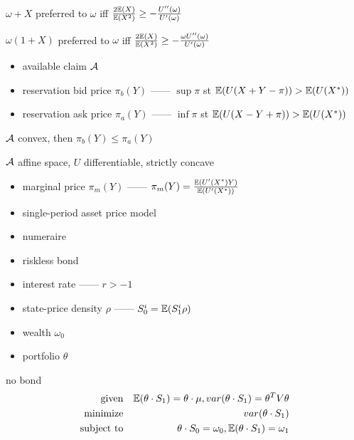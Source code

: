 \begin{fact}
    $\omega + X$ preferred to $\omega$ iff $\frac{2\mathbb{E}(X)}{\mathbb{E}(X^2)} \geq  -\frac{U''(\omega)}{U'(\omega)}$
\end{fact}

\begin{fact}
    $\omega(1 + X)$ preferred to $\omega$ iff $\frac{2\mathbb{E}(X)}{\mathbb{E}(X^2)} \geq  -\frac{\omega U''(\omega)}{U'(\omega)}$
\end{fact}

\begin{itemize}
    \item available claim $\mathcal{A}$
    \item reservation bid price $\pi_b(Y)$ ------ $\sup \pi$ st $\mathbb{E}(U(X + Y - \pi)) > \mathbb{E}(U(X^*))$
    \item reservation ask price $\pi_a(Y)$ ------ $\inf \pi$ st $\mathbb{E}(U(X - Y + \pi)) > \mathbb{E}(U(X^*))$
\end{itemize}

\begin{prop}
    $\mathcal{A}$ convex, then $\pi_b(Y) \leq \pi_a(Y)$
\end{prop}

\begin{setting}
    $\mathcal{A}$ affine space, $U$ differentiable, strictly concave
\end{setting}

\begin{itemize}
    \item marginal price $\pi_m(Y)$ ------ $\pi_m(Y) = \frac{\mathbb{E}(U'(X^*)Y)}{\mathbb{E}(U'(X^*))}$
\end{itemize}

\begin{itemize}
    \item single-period asset price model
    \item numeraire
    \item riskless bond
    \item interest rate ------ $r > -1$
    \item state-price density $\rho$ ------ $S_0^i = \mathbb{E}(S^i_1\rho)$
    \item wealth $\omega_0$
    \item portfolio $\theta$
\end{itemize}

\begin{example}
    no bond
    \begin{align*}
        \text{given} && \mathbb{E}(\theta\cdot S_1) =  \theta \cdot \mu, var(\theta\cdot S_1) = \theta^T V \theta\\
        \text{minimize} && var(\theta\cdot S_1) \\
        \text{subject to} && \theta\cdot S_0 = \omega_0, \mathbb{E}(\theta\cdot S_1) = \omega_1
    \end{align*}
\end{example}

